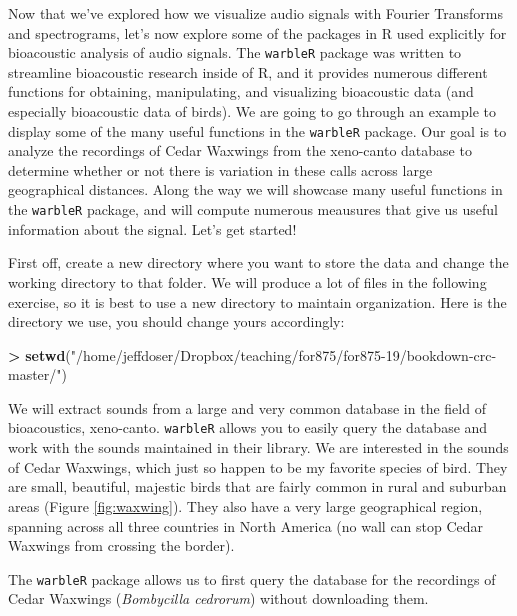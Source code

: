 \documentclass[]{krantz}
\makeatletter
\newenvironment{Shaded}{\begin{snugshade}}{\end{snugshade}}
\newcommand{\KeywordTok}[1]{\textcolor[rgb]{0.27,0.27,0.27}{\textbf{#1}}}
\newcommand{\StringTok}[1]{\textcolor[rgb]{0.5,0.5,0.5}{#1}}
\newcommand{\OperatorTok}[1]{\textcolor[rgb]{0.43,0.43,0.43}{\textbf{#1}}}
\newcommand{\NormalTok}[1]{#1}
\newenvironment{kframe}{%
\medskip{}
\setlength{\fboxsep}{.8em}
 \def\at@end@of@kframe{}%
 \ifinner\ifhmode%
  \def\at@end@of@kframe{\end{minipage}}%
  \begin{minipage}{\columnwidth}%
 \fi\fi%
 \def\FrameCommand##1{\hskip\@totalleftmargin \hskip-\fboxsep
 \colorbox{shadecolor}{##1}\hskip-\fboxsep
     \hskip-\linewidth \hskip-\@totalleftmargin \hskip\columnwidth}%
 \MakeFramed {\advance\hsize-\width
   \@totalleftmargin\z@ \linewidth\hsize
   \@setminipage}}%
 {\par\unskip\endMakeFramed%
 \at@end@of@kframe}
\renewenvironment{Shaded}{\begin{kframe}}{\end{kframe}}
\makeatother
\begin{document}
Now that we've explored how we visualize audio signals with Fourier
Transforms and spectrograms, let's now explore some of the packages in R
used explicitly for bioacoustic analysis of audio signals. The
\texttt{warbleR} package was written to streamline bioacoustic research
inside of R, and it provides numerous different functions for obtaining,
manipulating, and visualizing bioacoustic data (and especially
bioacoustic data of birds). We are going to go through an example to
display some of the many useful functions in the \texttt{warbleR}
package. Our goal is to analyze the recordings of Cedar Waxwings from
the xeno-canto database to determine whether or not there is variation
in these calls across large geographical distances. Along the way we
will showcase many useful functions in the \texttt{warbleR} package, and
will compute numerous meausures that give us useful information about
the signal. Let's get started!

First off, create a new directory where you want to store the data and
change the working directory to that folder. We will produce a lot of
files in the following exercise, so it is best to use a new directory to
maintain organization. Here is the directory we use, you should change
yours accordingly:

\begin{Shaded}
\begin{Highlighting}[]
\OperatorTok{>}\StringTok{ }\KeywordTok{setwd}\NormalTok{(}\StringTok{"/home/jeffdoser/Dropbox/teaching/for875/for875-19/bookdown-crc-master/"}\NormalTok{)}
\end{Highlighting}
\end{Shaded}

We will extract sounds from a large and very common database in the
field of bioacoustics, xeno-canto. \texttt{warbleR} allows you to easily
query the database and work with the sounds maintained in their library.
We are interested in the sounds of Cedar Waxwings, which just so happen
to be my favorite species of bird. They are small, beautiful, majestic
birds that are fairly common in rural and suburban areas (Figure
\ref{fig:waxwing}). They also have a very large geographical region,
spanning across all three countries in North America (no wall can stop
Cedar Waxwings from crossing the border).

The \texttt{warbleR} package allows us to first query the database for
the recordings of Cedar Waxwings (\emph{Bombycilla cedrorum}) without
downloading them.
\end{document}
